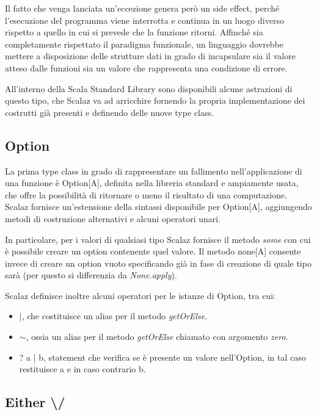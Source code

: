 Il fatto che venga lanciata un'eccezione genera però un side effect, perché l'esecuzione del programma viene interrotta e continua in un luogo diverso rispetto a quello in cui si prevede che la funzione ritorni. Affinché sia completamente rispettato il paradigma funzionale, un linguaggio dovrebbe mettere a disposizione delle strutture dati in grado di incapsulare sia il valore atteso dalle funzioni sia un valore che rappresenta una condizione di errore.

All'interno della Scala Standard Library sono disponibili alcune astrazioni di questo tipo, che Scalaz va ad arricchire fornendo la propria implementazione dei costrutti già presenti e definendo delle nuove type class.

\subsection{Option}

La prima type class in grado di rappresentare un fallimento nell'applicazione di una funzione è Option[A], definita nella libreria standard e ampiamente usata, che offre la possibilità di ritornare o meno il risultato di una computazione. Scalaz fornisce un'estensione della sintassi disponibile per Option[A], aggiungendo metodi di costruzione alternativi e alcuni operatori unari.

In particolare, per i valori di qualsiasi tipo Scalaz fornisce il metodo \textit{some} con cui è possibile creare un option contenente quel valore. Il metodo none[A] consente invece di creare un option vuoto specificando già in fase di creazione di quale tipo sarà (per questo si differenzia da \textit{None.apply}).



Scalaz definisce inoltre alcuni operatori per le istanze di Option, tra cui:

\begin{itemize}
\item |, che costituisce un alias per il metodo \textit{getOrElse}.
\item $\sim$, ossia un alias per il metodo \textit{getOrElse} chiamato con argomento \textit{zero}.
\item ? a | b, statement che verifica se è presente un valore nell'Option, in tal caso restituisce a e in caso contrario b.
\end{itemize}

\subsection{Either \textbackslash/}

